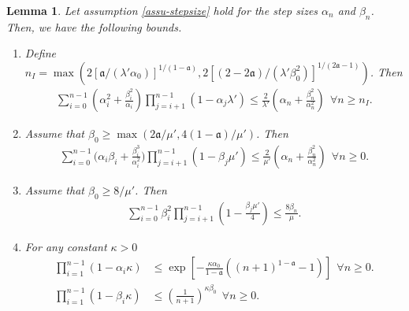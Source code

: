 \documentclass[letterpaper, 10 pt, conference]{ieeeconf}  %
\theoremstyle{definition}
\theoremstyle{plain}
\newtheorem{lemma}{Lemma}
\newcommand{\afrak}{\mathfrak{a}}
\begin{document}
\begin{lemma}\label{lem:step-size_bound}
Let assumption \ref{assu-stepsize} hold for the step sizes $\alpha_n$ and $\beta_n$. Then, we have the following bounds.
    \begin{enumerate}
        \item Define $n_I=\max(2[\afrak/(\lambda'\alpha_0)]^{1/(1-\afrak)}, 2[(2-2\afrak)/(\lambda'\beta_0^2)]^{1/(2\afrak-1)})$. Then
        \begin{align*}
            \sum_{i=0}^{n-1}\left(\alpha_i^2+\frac{\beta_i^2}{\alpha_i}\right)\prod_{j=i+1}^{n-1}(1-\alpha_j\lambda')\leq \frac{2}{\lambda'}\left(\alpha_n+\frac{\beta_n^2}{\alpha_n^2}\right)~~\forall n\geq n_I.
        \end{align*}
        \item Assume that $\beta_0\geq \max(2\afrak/\mu', 4(1-\afrak)/\mu')$. Then
        \begin{align*}
            \sum_{i=0}^{n-1}\Big(\alpha_i\beta_i+\frac{\beta_i^3}{\alpha_i^2}\Big)\prod_{j=i+1}^{n-1}(1-\beta_j\mu')\leq \frac{2}{\mu'}\left(\alpha_n+\frac{\beta_n^2}{\alpha_n^2}\right) ~~\forall n\geq 0.
        \end{align*}
        \item Assume that $\beta_0\geq 8/\mu'$. Then
        \begin{align*}
            \sum_{i=0}^{n-1}\beta_i^2\prod_{j=i+1}^{n-1}\left(1-\frac{\beta_j\mu'}{4}\right)\leq \frac{8\beta_n}{\mu}.
        \end{align*}
        \item For any constant $\kappa>0$
        \begin{align*}
            \prod_{i=1}^{n-1}(1-\alpha_i\kappa)&\leq \exp\left[-\frac{\kappa\alpha_0}{1-\afrak}\left((n+1)^{1-\afrak}-1\right)\right]~~\forall n\geq 0.\\
            \prod_{i=1}^{n-1}(1-\beta_i\kappa)&\leq \left(\frac{1}{n+1}\right)^{\kappa\beta_0}~~\forall n\geq 0.
        \end{align*}
    \end{enumerate}
\end{lemma}
\end{document}

